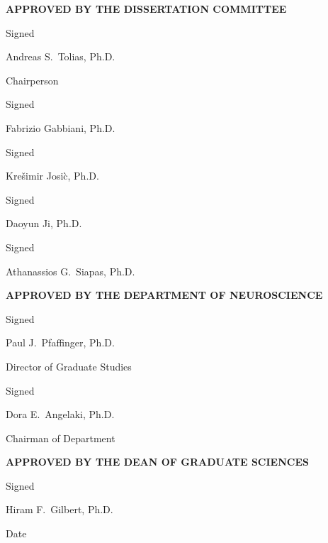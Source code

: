 \documentclass[12pt,twoside,openright]{report}
\begin{document}
\begin{center}
\textbf{\uppercase{\large Approved by the dissertation committee}}

\vspace{9pt}
Signed \underline{\hspace{3in}}

\vspace{-9pt}
Andreas S.\ Tolias, Ph.D.

\vspace{-9pt}
Chairperson


Signed \underline{\hspace{3in}}

\vspace{-9pt}
Fabrizio Gabbiani, Ph.D.


Signed \underline{\hspace{3in}}

\vspace{-9pt}
Kre\v{s}imir Josi\`{c}, Ph.D.

Signed \underline{\hspace{3in}}

\vspace{-9pt}
Daoyun Ji, Ph.D.

Signed \underline{\hspace{3in}}

\vspace{-9pt}
Athanassios G.\ Siapas, Ph.D.


\vspace{24pt}
\textbf{\uppercase{\large Approved by the department of neuroscience}}

\vspace{9pt}
Signed \underline{\hspace{3in}}

\vspace{-9pt}
Paul J.\ Pfaffinger, Ph.D.

\vspace{-9pt}
Director of Graduate Studies

Signed \underline{\hspace{3in}}

\vspace{-9pt}
Dora E.\ Angelaki, Ph.D.

\vspace{-9pt}
Chairman of Department

\vspace{24pt}
\textbf{\uppercase{\large Approved by the dean of graduate sciences}}

\vspace{9pt}
Signed \underline{\hspace{3in}}

\vspace{-9pt}
Hiram F.\ Gilbert, Ph.D.

\vspace{6pt}
Date \underline{\hspace{3in}}

\end{center}
\end{document}
